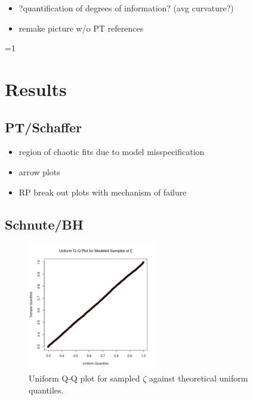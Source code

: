 \documentclass[12pt]{article}
\newcounter{alphasect}
\def\alphainsection{0}
\let\oldsection=\section
\def\section{%
  \ifnum\alphainsection=1%
    \addtocounter{alphasect}{1}
  \fi%
\oldsection}%
\begin{document}
\begin{itemize}
	\item ?quantification of degrees of information? (avg curvature?)
	\item remake picture w/o PT references
\end{itemize}

%
%

\section{Results}

%
\subsection{PT/Schaffer}
\begin{itemize}
	\item region of chaotic fits due to model misspecification
	\item arrow plots 
	\item RP break out plots with mechanism of failure
\end{itemize}

%
\subsection{Schnute/BH}

%
\begin{figure}[h!]
\includegraphics[width=0.5\textwidth]{../gpBias/qqUnif.png}
\caption{Uniform Q-Q plot for sampled $\zeta$ against theoretical uniform quantiles.}
\end{figure}
\end{document}
